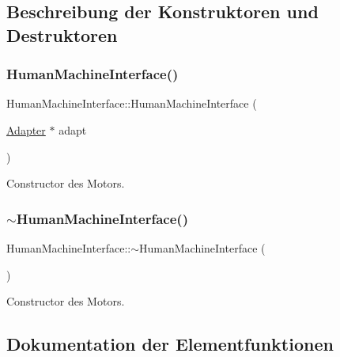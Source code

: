 \subsection{Beschreibung der Konstruktoren und Destruktoren}
\hypertarget{class_human_machine_interface_aee37229a726c66857601422ba1605ac6}{}\label{class_human_machine_interface_aee37229a726c66857601422ba1605ac6} 
\subsubsection{\texorpdfstring{Human\+Machine\+Interface()}{HumanMachineInterface()}}
{\footnotesize\ttfamily Human\+Machine\+Interface\+::\+Human\+Machine\+Interface (\begin{DoxyParamCaption}\item[{\hyperlink{class_adapter}{Adapter} $\ast$}]{adapt }\end{DoxyParamCaption})}

Constructor des Motors. \hypertarget{class_human_machine_interface_a2ac7ae9e7e6be379da946eac459ea243}{}\label{class_human_machine_interface_a2ac7ae9e7e6be379da946eac459ea243} 
\subsubsection{\texorpdfstring{$\sim$\+Human\+Machine\+Interface()}{~HumanMachineInterface()}}
{\footnotesize\ttfamily Human\+Machine\+Interface\+::$\sim$\+Human\+Machine\+Interface (\begin{DoxyParamCaption}{ }\end{DoxyParamCaption})\hspace{0.3cm}{\ttfamily [virtual]}}

Constructor des Motors. 

\subsection{Dokumentation der Elementfunktionen}
\hypertarget{class_human_machine_interface_ad9844e21fd01872ad78afb9e16acc59f}{}\label{class_human_machine_interface_ad9844e21fd01872ad78afb9e16acc59f} 
